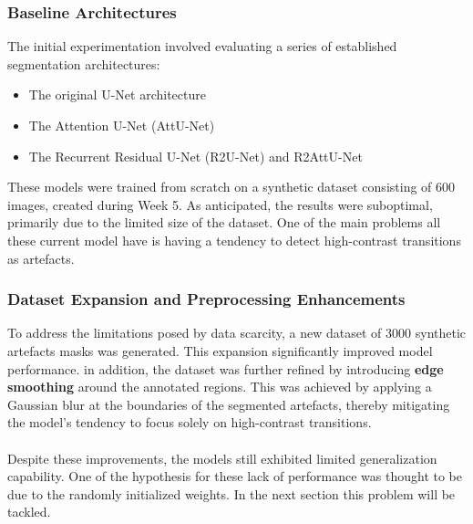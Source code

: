 \documentclass[openany, 12pt]{article}
\begin{document}
{	\subsubsection*{Baseline Architectures}
	The initial experimentation involved evaluating a series of established segmentation architectures:
	\begin{itemize}
		\item The original U-Net architecture ~\cite{ronneberger_u-net_2015}
		\item The Attention U-Net (AttU-Net) ~\cite{oktay_attention_2018}
		\item The Recurrent Residual U-Net (R2U-Net) and R2AttU-Net ~\cite{alom_recurrent_2018}
	\end{itemize}
	These models were trained from scratch on a synthetic dataset consisting of 600 images, created during Week 5. As anticipated, the results were suboptimal, primarily due to the limited size of the dataset. One of the main problems all these current model have is having a tendency to detect high-contrast transitions as artefacts.
	\subsubsection*{Dataset Expansion and Preprocessing Enhancements}
	To address the limitations posed by data scarcity, a new dataset of 3000 synthetic artefacts masks was generated. This expansion significantly improved model performance. in addition, the dataset was further refined by introducing \textbf{edge smoothing} around the annotated regions. This was achieved by applying a Gaussian blur at the boundaries of the segmented artefacts, thereby mitigating the model's tendency to focus solely on high-contrast transitions.\\
	\\
	Despite these improvements, the models still exhibited limited generalization capability. One of the hypothesis for these lack of performance was thought to be due to the randomly initialized weights. In the next section this problem will be tackled.
}
\end{document}
